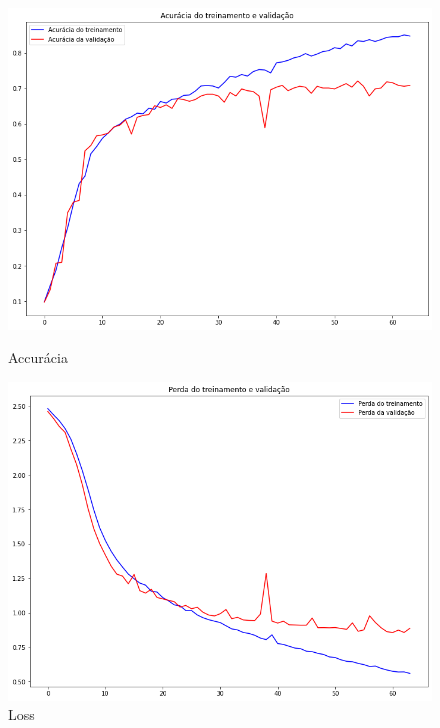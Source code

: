 \documentclass[12pt]{article}
\begin{document}
\begin{figure}[!htb]
  \begin{minipage}{.47\textwidth}
    \centering
    \includegraphics[width=1.1\linewidth]{experiments/lenet5_noaug_64/accuracy.png}
    \caption{Accurácia}\label{fig:experiment_lenet5_noaug_64_accuracy}
  \end{minipage}\hfill
  \begin{minipage}{.47\textwidth}
    \centering
    \includegraphics[width=1.1\linewidth]{experiments/lenet5_noaug_64/loss.png}
    \caption{Loss}\label{fig:experiment_lenet5_noaug_64_loss}
  \end{minipage}
\end{figure}
\end{document}
